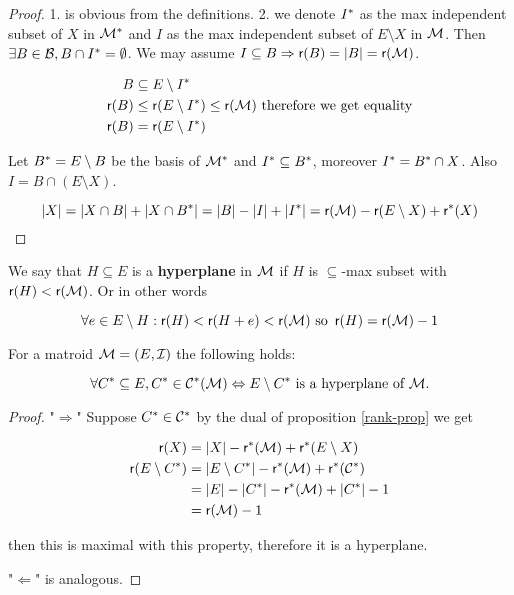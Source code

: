 \begin{proof}
	1. is obvious from the definitions. 2. we denote $I^{\ast}$ as the max independent subset of $X$ in $\mathcal{M}^{\ast}$ and $I$ as the max independent subset of $E \setminus X$ in $\mathcal{M}$. Then $\exists B \in \mathcal{B}, B \cap I^{\ast} = \emptyset$. We may assume $I \subseteq B \Rightarrow \operatorname{\textsf{r}}(B) = |B| = \operatorname{\textsf{r}}(\mathcal{M})$.
	
	$$
	\begin{aligned}
		B &\subseteq E \setminus I^{\ast}\\
		\operatorname{\textsf{r}}(B) &\leq \operatorname{\textsf{r}}(E \setminus I^{\ast}) \leq \operatorname{\textsf{r}}(\mathcal{M}) \text{ therefore we get equality}\\
		\operatorname{\textsf{r}}(B) &= \operatorname{\textsf{r}}(E \setminus I^{\ast})
	\end{aligned}
	$$
	
	\noindent Let $B^{\ast} = E \setminus B$ be the basis of $\mathcal{M}^{\ast}$ and $I^{\ast} \subseteq B^{\ast}$, moreover $I^{\ast} = B^{\ast} \cap X$. Also $I = B \cap (E \setminus X)$.
	
	$$
	|X| = |X \cap B| + |X \cap B^{\ast}| = |B| - |I| + |I^{\ast}| = \operatorname{\textsf{r}}(\mathcal{M}) - \operatorname{\textsf{r}}(E \setminus X) + \operatorname{\textsf{r}}^{\ast}(X)
	$$
\end{proof}

\begin{defn}
	We say that $H \subseteq E$ is a \textbf{hyperplane} in $\mathcal{M}$ if $H$ is $\subseteq$-max subset with $\operatorname{\textsf{r}}(H) < \operatorname{\textsf{r}}(\mathcal{M})$. Or in other words
	
	$$
	\forall e \in E \setminus H : \operatorname{\textsf{r}}(H) < \operatorname{\textsf{r}}(H+e) < \operatorname{\textsf{r}}(\mathcal{M}) \text{ so } \operatorname{\textsf{r}}(H) = \operatorname{\textsf{r}}(\mathcal{M})-1
	$$
\end{defn}

\begin{lemma}
	For a matroid $\mathcal{M} = (E, \mathcal{I})$ the following holds:
	
	$$
	\forall C^{\ast} \subseteq E, C^{\ast} \in \mathcal{C}^{\ast}(\mathcal{M}) \Leftrightarrow E \setminus C^{\ast} \text{ is a hyperplane of } \mathcal{M}.
	$$
\end{lemma}

\begin{proof}
	"$\Rightarrow$" Suppose $C^{\ast} \in \mathcal{C}^{\ast}$ by the dual of proposition \ref{rank-prop} we get
	
	$$
	\begin{aligned}
		\operatorname{\textsf{r}}(X) &= |X| - \operatorname{\textsf{r}}^{\ast}(\mathcal{M}) + \operatorname{\textsf{r}}^{\ast}(E \setminus X)\\
		\operatorname{\textsf{r}}(E \setminus C^{\ast}) &= |E \setminus C^{\ast}| - \operatorname{\textsf{r}}^{\ast}(\mathcal{M}) + \operatorname{\textsf{r}}^{\ast}(\mathcal{C}^{\ast})\\
		&= |E| - |C^{\ast}| - \operatorname{\textsf{r}}^{\ast}(\mathcal{M}) + |C^{\ast}| - 1\\
		&= \operatorname{\textsf{r}}(\mathcal{M}) - 1
	\end{aligned}
	$$
	
	\noindent then this is maximal with this property, therefore it is a hyperplane.
	
	"$\Leftarrow$" is analogous.
\end{proof}

